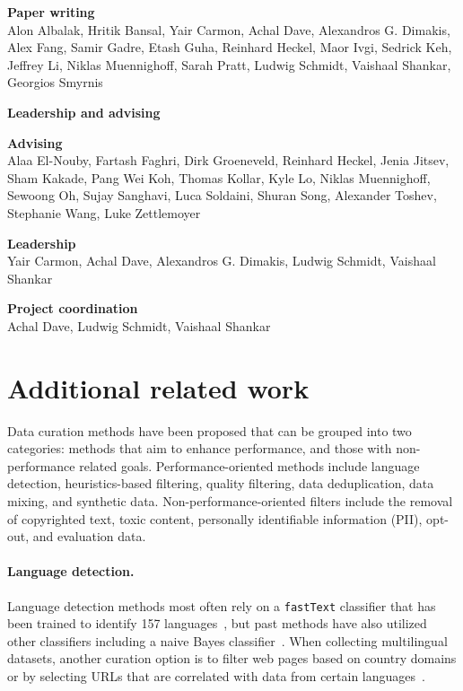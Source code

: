 \documentclass{article}
\newcommand{\fasttext}{\texttt{fastText}\xspace}
\begin{document}
\textbf{Paper writing}\\[0.25em]
Alon Albalak, Hritik Bansal, Yair Carmon, Achal Dave, Alexandros G. Dimakis, Alex Fang, Samir Gadre, Etash Guha, Reinhard Heckel, Maor Ivgi, Sedrick Keh, Jeffrey Li, Niklas Muennighoff, Sarah Pratt, Ludwig Schmidt, Vaishaal Shankar, Georgios Smyrnis

\begin{center}\large\textbf{Leadership and advising}\end{center}

\textbf{Advising}\\[0.25em]
Alaa El-Nouby, Fartash Faghri, Dirk Groeneveld, Reinhard Heckel, Jenia Jitsev, Sham Kakade, Pang Wei Koh, Thomas Kollar, Kyle Lo, Niklas Muennighoff, Sewoong Oh, Sujay Sanghavi, Luca Soldaini, Shuran Song, Alexander Toshev, Stephanie Wang, Luke Zettlemoyer

\textbf{Leadership}\\[0.25em]
Yair Carmon, Achal Dave, Alexandros G. Dimakis, Ludwig Schmidt, Vaishaal Shankar

\textbf{Project coordination}\\[0.25em]
Achal Dave, Ludwig Schmidt, Vaishaal Shankar

\clearpage
\section{Additional related work}
\label{appx:related}

Data curation methods have been proposed that can be grouped into two categories: methods that aim to enhance performance, and those with non-performance related goals.
Performance-oriented methods include language detection, heuristics-based filtering, quality filtering, data deduplication, data mixing, and synthetic data. Non-performance-oriented filters include the removal of copyrighted text, toxic content, personally identifiable information (PII), opt-out, and evaluation data.

\paragraph{Language detection.}
Language detection methods most often rely on a \fasttext classifier that has been trained to identify 157 languages~\citep{grave-etal-2018-learning, refinedweb, soldaini2024dolma}, but past methods have also utilized other classifiers including a naive Bayes classifier~\citep{raffel2020exploring}. When collecting multilingual datasets, another curation option is to filter web pages based on country domains or by selecting URLs that are correlated with data from certain languages~\citep{luukkonen-etal-2023-fingpt, singh2024aya, peng2024eagle}.
\end{document}
